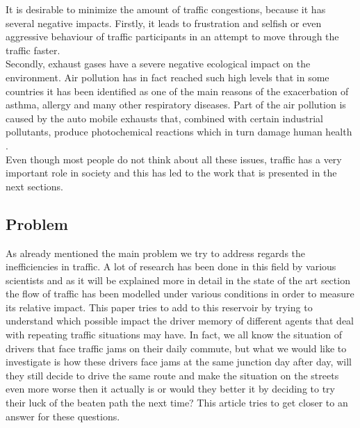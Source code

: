 \documentclass[a4paper,hidelinks]{article}
\begin{document}
It is desirable to minimize the amount of traffic congestions, because it has several negative impacts. Firstly, it leads to frustration and selfish or even aggressive behaviour of traffic participants in an attempt to move through the traffic faster. \\
Secondly, exhaust gases have a severe negative ecological impact on the environment. Air pollution has in fact reached such high levels that in some countries it has been identified as one of the main reasons of the exacerbation of asthma, allergy and many other respiratory diseases. Part of the air pollution is caused by the auto mobile exhausts that, combined with certain industrial pollutants, produce photochemical reactions which in turn damage human health \cite{ghose2005assessment}. \\
Even though most people do not think about all these issues, traffic has a very important role in society and this has led to the work that is presented in the next sections.


\subsection{Problem}
As already mentioned the main problem we try to address regards the inefficiencies in traffic. A lot of research has been done in this field by various scientists and as it will be explained more in detail in the state of the art section the flow of traffic has been modelled under various conditions in order to measure its relative impact. This paper tries to add to this reservoir by trying to understand which possible impact the driver memory of different agents that deal with repeating traffic situations may have. In fact, we all know the situation of drivers that face traffic jams on their daily commute, but what we would like to investigate is how these drivers face jams at the same junction day after day, will they still decide to drive the same route and make the situation on the streets even more worse then it actually is or would they better it by deciding to try their luck of the beaten path the next time? This article tries to get closer to an answer for these questions. 
\end{document}

